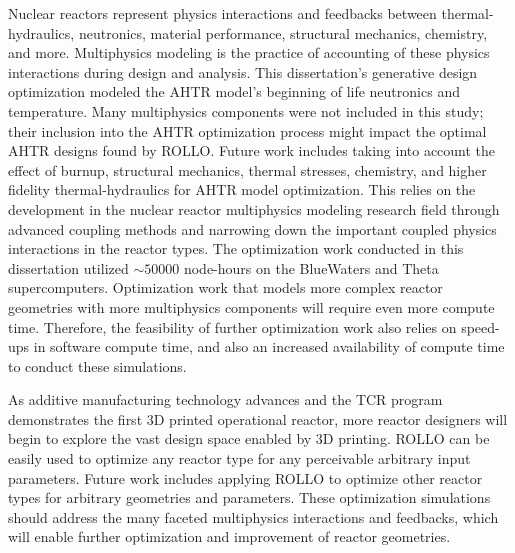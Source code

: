 Nuclear reactors represent physics interactions and feedbacks between thermal-hydraulics, 
neutronics, material performance, structural mechanics, chemistry, and more. 
Multiphysics modeling is the practice of accounting of these physics interactions 
during design and analysis. 
This dissertation's generative design optimization modeled the \gls{AHTR} model's 
beginning of life neutronics and temperature. 
Many multiphysics components were not included in this study; their inclusion into 
the \gls{AHTR} optimization process might impact the optimal \gls{AHTR} designs 
found by \gls{ROLLO}. 
Future work includes taking into account the effect of burnup, structural mechanics, 
thermal stresses, chemistry, and higher fidelity thermal-hydraulics for \gls{AHTR} 
model optimization. 
This relies on the development in the nuclear reactor multiphysics modeling research 
field through advanced coupling methods and narrowing down the important coupled 
physics interactions in the reactor types. 
The optimization work conducted in this dissertation utilized $\sim 50000$ node-hours 
on the BlueWaters and Theta supercomputers. 
Optimization work that models more complex reactor geometries with more 
multiphysics components will require even more compute time. 
Therefore, the feasibility of further optimization work also relies on speed-ups 
in software compute time, and also an increased availability of compute time to 
conduct these simulations. 

As additive manufacturing technology advances and the \gls{TCR} program 
demonstrates the first 3D printed operational reactor, more reactor designers 
will begin to explore the vast design space enabled by 3D printing. 
\gls{ROLLO} can be easily used to optimize any reactor type for any perceivable 
arbitrary input parameters. 
Future work includes applying \gls{ROLLO} to optimize other reactor types for arbitrary
geometries and parameters. 
These optimization simulations should address the many faceted multiphysics interactions 
and feedbacks, which will enable further optimization and improvement of reactor 
geometries.